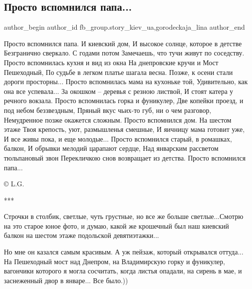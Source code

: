  
 
 
 
 
 
\subsection{Просто вспомнился папа...}
\label{sec:15_01_2022.fb.fb_group.story_kiev_ua.1.papa}
 
\ifcmt
 author_begin
   author_id fb_group.story_kiev_ua,gorodeckaja_lina
 author_end
\fi

Просто вспомнился папа. И киевский дом,
И высокое солнце, которое в детстве
Безгранично сверкало. С годами потом
Замечаешь, что тучи живут по соседству.
Просто вспомнилась кухня и вид из окна
На днепровские кручи и Мост Пешеходный,
По судьбе в легком платье шагала весна.
Позже, к осени стали дороги просторны...
Просто вспомнилась мама на кухоньке той,
Удивительно, как она все успевала...
За окошком – деревья с резною листвой,
И стоят катера у речного вокзала.
Просто вспомнилась горка и фуникулер,
Две копейки проезд, и под небом беззвездным,
Пряный вкус чьих-то губ, ни о чем разговор,
Немудренное позже окажется сложным.
Просто вспомнился дом. На шестом этаже
Твоя крепость, уют, размышленья смешные,
И яичницу мама готовит уже,
И все живы пока, и еще молодые...
Просто вспомнился старый, в ромашках, балкон,
И обрывки мелодий царапают сердце,
Над январским рассветом тюльпановый звон
Перекличкою снов возвращает из детства.
Просто вспомнился папа...

© L.G.

***

Строчки в столбик, светлые, чуть грустные, но все же больше светлые...Смотрю на
это старое юное фото, и думаю, какой же крошечный был наш киевский балкон на
шестом этаже подольской девятиэтажки...  

Но мне он казался самым красивым. А уж пейзаж, который открывался оттуда... На
Пешеходный мост над Днепром, на Владимирскую горку и фуникулер, вагончики
которого я могла сосчитать, когда листья опадали, на сирень в мае, и
заснеженный двор в январе... Все было.))

